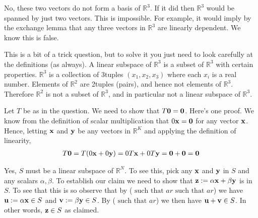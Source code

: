 \documentclass[letterpaper,10pt,english]{jupyterBook}
\begin{document}
\sphinxAtStartPar
{}

\sphinxAtStartPar
No, these two vectors do not form a basis of \(\mathbb{R}^3\).  If it did then \(\mathbb{R}^3\) would be
spanned by just two vectors.  This is impossible.  For example, it would
imply by the exchange lemma that any three vectors in \(\mathbb{R}^3\) are linearly
dependent.  We know this is false.

\sphinxAtStartPar
{}

\sphinxAtStartPar
This is a bit of a trick question, but to solve it you just need to look
carefully at the definitions (as always). A linear subspace of \(\mathbb{R}^3\) is
a subset of \(\mathbb{R}^3\) with certain properties. \(\mathbb{R}^3\) is a collection of
3\sphinxhyphen{}tuples \((x_1, x_2, x_3)\) where each \(x_i\) is a real number. Elements of
\(\mathbb{R}^2\) are 2\sphinxhyphen{}tuples (pairs), and hence not elements of \(\mathbb{R}^3\).
Therefore \(\mathbb{R}^2\) is not a subset of \(\mathbb{R}^3\), and in particular not a
linear subspace of \(\mathbb{R}^3\).

\sphinxAtStartPar
{}

\sphinxAtStartPar
Let \(T\) be as in the question. We need to show that \(T {\bf 0} =
{\bf 0}\).
Here’s one proof. We know from the definition of scalar
multiplication that \(0 {\bf x} = {\bf 0}\) for any vector \({\bf x}\).
Hence, letting \({\bf x}\) and \({\bf y}\) be any vectors in \(\mathbb{R}^K\) and
applying the definition of linearity,
\begin{equation*}
\begin{split}
%
T{\bf 0} = T(0 {\bf x} + 0 {\bf y}) = 0 T{\bf x} + 0 T {\bf y} 
= {\bf 0} + {\bf 0} 
= {\bf 0}
%
\end{split}
\end{equation*}
\sphinxAtStartPar
{}

\sphinxAtStartPar
Yes, \(S\) must be a linear subspace of \(\mathbb{R}^N\). To see this, pick any
\({\bf x}\) and \({\bf y}\) in \(S\) and any scalars \(\alpha, \beta\).
To establish our claim we need to show that \({\bf z} := \alpha {\bf x} +
\beta {\bf y}\) is in \(S\). To see that this is so observe that by (\(\text{ such that }ar\text{ such that }ar\))
we have \({\bf u} := \alpha{\bf x} \in S\)
and \({\bf v} := \beta{\bf y} \in S\). By (\(\text{ such that }ar\)) we then have \({\bf u} +
{\bf v} \in S\). In other words, \({\bf z} \in S\) as claimed.
\end{document}
